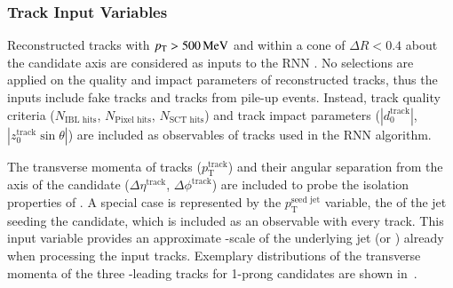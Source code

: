 \subsubsection{Track Input Variables}

Reconstructed tracks with $p_{\text{T}} > \SI{500}{\ensuremath{\text{MeV}}}$ and within a cone of
$\Delta R < 0.4$ about the \tauhadvis candidate axis are considered as
inputs to the RNN \tauid. No selections are applied on the quality and
impact parameters of reconstructed tracks, thus the inputs include
fake tracks and tracks from pile-up events. Instead, track quality
criteria ($N_{\text{IBL hits}}$, $N_{\text{Pixel hits}}$,
$N_{\text{SCT hits}}$) and track impact parameters
($|d_0^{\text{track}}|$, $|z_0^{\text{track}} \sin\theta|$) are
included as observables of tracks used in the RNN \tauid algorithm.

The transverse momenta of tracks ($p_{\text{T}}^{\text{track}}$) and
their angular separation from the axis of the \tauhadvis candidate
($\Delta \eta^{\text{track}}$, $\Delta \phi^{\text{track}}$) are
included to probe the isolation properties of \tauhadvis. A special
case is represented by the $p_{\text{T}}^{\text{seed jet}}$ variable,
the \pT of the jet seeding the \tauhadvis candidate, which is included
as an observable with every track. This input variable provides an
approximate \pT-scale of the underlying jet (or \tauhadvis) already
when processing the input tracks. Exemplary distributions of the
transverse momenta of the three \pT-leading tracks for 1-prong
\tauhadvis candidates are shown
in~.

